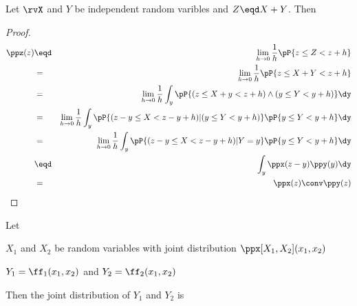 \begin{theorem}
Let $\rvX$ and $Y$ be independent random varibles and $Z\eqd X+Y$.
Then
\end{theorem}
\begin{proof}
\begin{eqnarray*}
  \ppz(z)
    &\eqd& \lim_{h\to0}\frac{1}{h} \pP{z \le Z < z+h }
  \\&=&    \lim_{h\to0}\frac{1}{h} \pP{z \le X+Y < z+h }
  \\&=&    \lim_{h\to0}\frac{1}{h} \int_y \pP{(z \le X+y < z+h) \land (y\le Y<y+h) } \dy
  \\&=&    \lim_{h\to0}\frac{1}{h} \int_y \pP{(z-y \le X < z-y+h) | (y\le Y<y+h) }\pP{y\le Y<y+h} \dy
  \\&=&    \lim_{h\to0}\frac{1}{h} \int_y \pP{(z-y \le X < z-y+h) | Y=y }\pP{y\le Y<y+h} \dy
  \\&\eqd& \int_y \ppx(z-y) \ppy(y)  \dy
  \\&=&    \ppx(z) \conv \ppy(z)
\end{eqnarray*}
\end{proof}

\begin{theorem}
\label{thm:x1x2->y1y2}
Let
\begin{liste}
  \item $X_1$ and $X_2$ be random variables with joint distribution
        $\ppx[X_1,X_2](x_1,x_2)$
  \item $Y_1=\ff_1(x_1,x_2)$ and $Y_2=\ff_2(x_1,x_2)$
\end{liste}
Then the joint distribution of $Y_1$ and $Y_2$ is
\end{theorem}

